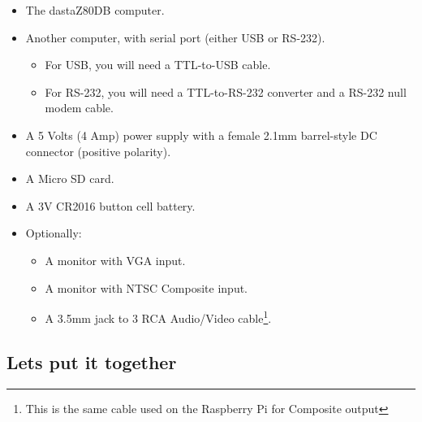 \begin{itemize}
    \item The dastaZ80DB computer.
    \item Another computer, with serial port (either USB or RS-232).
    \begin{itemize}
        \item For USB, you will need a TTL-to-USB cable.
        \item For RS-232, you will need a TTL-to-RS-232 converter and a RS-232
            null modem cable.
    \end{itemize}
    \item A 5 Volts (4 Amp) power supply with a female 2.1mm barrel-style DC
    connector (positive polarity).
    \item A Micro SD card.
    \item A 3V CR2016 button cell battery.
    \item Optionally:
    \begin{itemize}
        \item A monitor with VGA input.
        \item A monitor with NTSC Composite input.
        \item A 3.5mm jack to 3 RCA Audio/Video cable\footnote{This is the same
            cable used on the Raspberry Pi for Composite output}.
    \end{itemize}
\end{itemize}

\subsection{Lets put it together}

